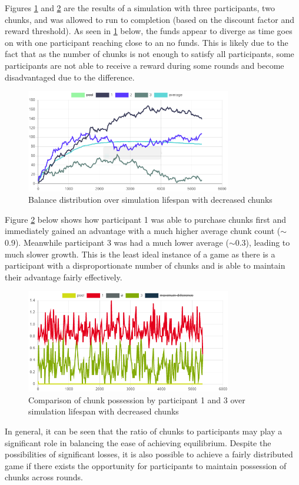 Figures \ref{figure:simulation-divergence-balance} and \ref{figure:simulation-divergence-chunks} are the results of a simulation with three participants, two chunks, and was allowed to run to completion (based on the discount factor and reward threshold). As seen in \cref{figure:simulation-divergence-balance} below, the funds appear to diverge as time goes on with one participant reaching close to an no funds. This is likely due to the fact that as the number of chunks is not enough to satisfy all participants, some participants are not able to receive a reward during some rounds and become disadvantaged due to the difference. 

\begin{figure}[H]
  \centering
  \caption{Balance distribution over simulation lifespan with decreased chunks}
  \label{figure:simulation-divergence-balance}
  \includegraphics[width=0.8\textwidth]{media/simulation-divergence-balance.PNG}
\end{figure}

Figure \ref{figure:simulation-divergence-chunks} below shows how participant 1 was able to purchase chunks first and immediately gained an advantage with a much higher average chunk count ($\sim$0.9). Meanwhile participant 3 was had a much lower average ($\sim$0.3), leading to much slower growth. This is the least ideal instance of a game as there is a participant with a disproportionate number of chunks and is able to maintain their advantage fairly effectively.
 
\begin{figure}[H]
  \centering
  \caption{Comparison of chunk possession by participant 1 and 3 over simulation lifespan with decreased chunks}
  \label{figure:simulation-divergence-chunks}
  \includegraphics[width=0.8\textwidth]{media/simulation-divergence-chunks.PNG}
\end{figure}

In general, it can be seen that the ratio of chunks to participants may play a significant role in balancing the ease of achieving equilibrium. Despite the possibilities of significant losses, it is also possible to achieve a fairly distributed game if there exists the opportunity for participants to maintain possession of chunks across rounds.
